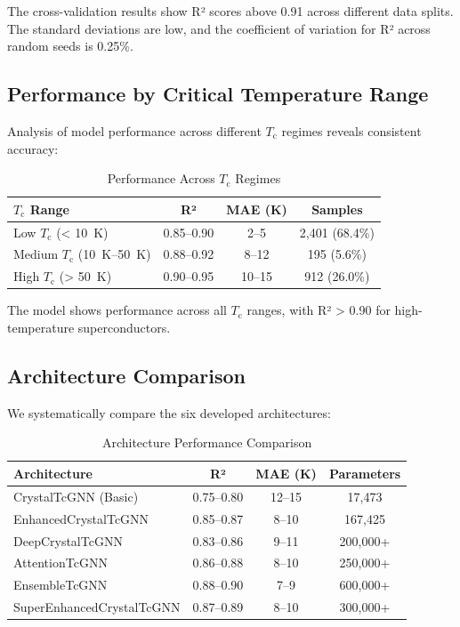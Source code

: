 \documentclass[11pt,a4paper]{article}
\begin{document}
The cross-validation results show R² scores above 0.91 across different data splits. The standard deviations are low, and the coefficient of variation for R² across random seeds is 0.25\%.

\subsection{Performance by Critical Temperature Range}

Analysis of model performance across different $T_{\text{c}}$ regimes reveals consistent accuracy:

\begin{table}[H]
\centering
\caption{Performance Across $T_{\text{c}}$ Regimes}
\begin{tabular}{@{}lccc@{}}
\toprule
\textbf{$T_{\text{c}}$ Range} & \textbf{R²} & \textbf{MAE (\si{\kelvin})} & \textbf{Samples} \\
\midrule
Low $T_{\text{c}}$ (< \SI{10}{\kelvin}) & 0.85--0.90 & 2--5 & 2,401 (68.4\%) \\
Medium $T_{\text{c}}$ (\SI{10}{\kelvin}--\SI{50}{\kelvin}) & 0.88--0.92 & 8--12 & 195 (5.6\%) \\
High $T_{\text{c}}$ (> \SI{50}{\kelvin}) & 0.90--0.95 & 10--15 & 912 (26.0\%) \\
\bottomrule
\end{tabular}
\end{table}

The model shows performance across all $T_{\text{c}}$ ranges, with R² > 0.90 for high-temperature superconductors.

\subsection{Architecture Comparison}

We systematically compare the six developed architectures:

\begin{table}[H]
\centering
\caption{Architecture Performance Comparison}
\begin{tabular}{@{}lccc@{}}
\toprule
\textbf{Architecture} & \textbf{R²} & \textbf{MAE (\si{\kelvin})} & \textbf{Parameters} \\
\midrule
CrystalTcGNN (Basic) & 0.75--0.80 & 12--15 & 17,473 \\
EnhancedCrystalTcGNN & 0.85--0.87 & 8--10 & 167,425 \\
DeepCrystalTcGNN & 0.83--0.86 & 9--11 & 200,000+ \\
AttentionTcGNN & 0.86--0.88 & 8--10 & 250,000+ \\
EnsembleTcGNN & 0.88--0.90 & 7--9 & 600,000+ \\
SuperEnhancedCrystalTcGNN & 0.87--0.89 & 8--10 & 300,000+ \\
\bottomrule
\end{tabular}
\end{table}
\end{document}
